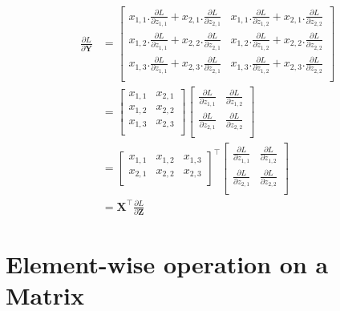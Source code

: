 \documentclass{article}
\newcommand{\transpose}[1]{#1^\top}
\newcommand{\matr}[1]{\mathbf{#1}} %
\begin{document}
\begin{align}
\frac{\partial L}{\partial \matr{Y}} &=
\begin{bmatrix}
x_{1,1}.\frac{\partial L}{\partial z_{1,1}} + x_{2,1}.\frac{\partial L}{\partial z_{2,1}} &
x_{1,1}.\frac{\partial L}{\partial z_{1,2}} + x_{2,1}.\frac{\partial L}{\partial z_{2,2}} \\[0.7em]
x_{1,2}.\frac{\partial L}{\partial z_{1,1}} + x_{2,2}.\frac{\partial L}{\partial z_{2,1}} &
x_{1,2}.\frac{\partial L}{\partial z_{1,2}} + x_{2,2}.\frac{\partial L}{\partial z_{2,2}} \\[0.7em]
x_{1,3}.\frac{\partial L}{\partial z_{1,1}} + x_{2,3}.\frac{\partial L}{\partial z_{2,1}} &
x_{1,3}.\frac{\partial L}{\partial z_{1,2}} + x_{2,3}.\frac{\partial L}{\partial z_{2,2}} \\[0.7em]
\end{bmatrix}
\nonumber \\
&=
\begin{bmatrix}
x_{1,1} & x_{2,1} \\%
x_{1,2} & x_{2,2} \\%
x_{1,3} & x_{2,3} \\%
\end{bmatrix}
\begin{bmatrix}
\frac{\partial L}{\partial z_{1,1}} & \frac{\partial L}{\partial z_{1,2}} \\[0.7em]
\frac{\partial L}{\partial z_{2,1}} & \frac{\partial L}{\partial z_{2,2}} \\[0.7em]
\end{bmatrix}
\nonumber \\
&=
\transpose{
\begin{bmatrix}
x_{1,1} & x_{1,2} & x_{1,3} \\%
x_{2,1} & x_{2,2} & x_{2,3} \\%
\end{bmatrix}}
\begin{bmatrix}
\frac{\partial L}{\partial z_{1,1}} & \frac{\partial L}{\partial z_{1,2}} \\[0.7em]
\frac{\partial L}{\partial z_{2,1}} & \frac{\partial L}{\partial z_{2,2}} \\[0.7em]
\end{bmatrix}
\nonumber \\
&= \transpose{\matr{X}} \frac{\partial L}{\partial \matr{Z}}
\end{align}

\section{Element-wise operation on a Matrix}
\end{document}
